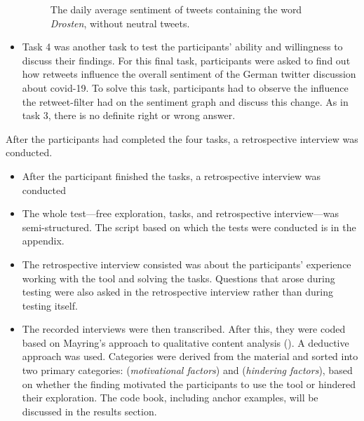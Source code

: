 \begin{itemize}
\begin{figure}[h!tb]
            \caption{The daily average sentiment of tweets containing the word \emph{Drosten}, without neutral tweets.}
            \label{fig:sentiment_drosten_noneutral}
        \end{figure}
        \item Task 4 was another task to test the participants' ability and willingness to discuss their findings. %
        For this final task, participants were asked to find out how retweets influence the overall sentiment of the German twitter discussion about covid-19. To solve this task, participants had to observe the influence the retweet-filter had on the sentiment graph and discuss this change. As in task 3, there is no definite right or wrong answer.
    \end{itemize}

    After the participants had completed the four tasks, a retrospective interview was conducted. 
    \begin{itemize}
    \item After the participant finished the tasks, a retrospective interview was conducted
    \item The whole test---free exploration, tasks, and retrospective interview---was semi-structured. The script based on which the tests were conducted is in the appendix.
    \item The retrospective interview consisted was about the participants' experience working with the tool and solving the tasks. Questions that arose during testing were also asked in the retrospective interview rather than during testing itself.
    \item The recorded interviews were then transcribed. After this, they were coded based on Mayring's approach to qualitative content analysis (\cite{mayring2010qualitative}). A deductive approach was used. Categories were derived from the material and sorted into two primary categories:  (\emph{motivational factors}) and  (\emph{hindering factors}), based on whether the finding motivated the participants to use the tool or hindered their exploration. The code book, including anchor examples, will be discussed in the results section.
\end{itemize}
